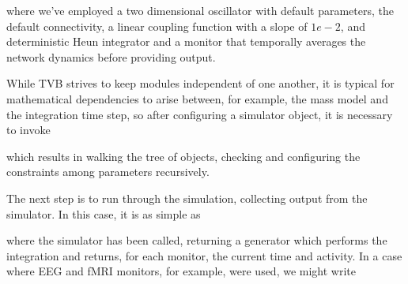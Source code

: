 
\noindent where we've employed a two dimensional oscillator
with default parameters, the default connectivity, a linear 
coupling function with a slope of $1e-2$, and deterministic
Heun integrator and a monitor that temporally averages the 
network dynamics before providing output.

While TVB strives to keep modules independent of one another,
it is typical for mathematical dependencies to arise between, 
for example, the mass model and the integration time step, so
after configuring a simulator object, it is necessary to invoke


which results in walking the tree of objects, checking and 
configuring the constraints among parameters recursively.

The next step is to run through the simulation, collecting
output from the simulator. In this case, it is as simple as

\noindent where the simulator has been called, returning a 
generator which performs the integration and returns, for each
monitor, the current time and activity. In a case where EEG 
and fMRI monitors, for example, were used, we might write

